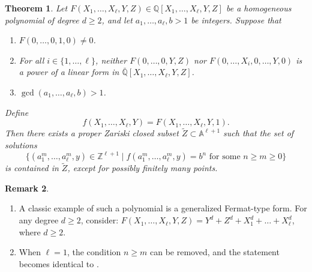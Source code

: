 \documentclass[10pt]{amsart}
\numberwithin{equation}{section}
\theoremstyle{plain}
\newtheorem{theorem}{Theorem}[section]
\theoremstyle{definition}
\newtheorem{remark}[theorem]{Remark}
\begin{document}
\begin{theorem}\label{DiophantinrEq}
Let $F (X_1,\ldots,X_{\ell}, Y, Z) \in \mathbb{Q}[X_1,\ldots,X_{\ell}, Y, Z]$ be a homogeneous polynomial of degree $d \ge 2$, and let $a_1,\ldots,a_{\ell},b > 1$ be integers. Suppose that 
\begin{enumerate}
\item[\rm(i)] $F(0,\ldots,0,1,0) \neq 0$.

\item[\rm(ii)] For all $i \in \{1,\ldots,\ell\}$, neither $F(0,\ldots,0,Y,Z)$ nor $F(0,\ldots,X_i,0,\ldots,Y,0)$ is a power of a linear form in $\bar{\mathbb{Q}}[X_1,\ldots,X_{\ell},Y,Z]$.
\label{tancond}

\item[\rm(iii)] $\gcd(a_1,\ldots,a_{\ell},b) > 1$.
\end{enumerate}

Define 
\[
f(X_1,\ldots,X_{\ell},Y)=F(X_1,\ldots,X_{\ell},Y,1).
\]
Then there exists a proper Zariski closed subset $\tilde Z\subset \mathbb A^{\ell+1}$ such that the set of solutions
\[
\{(a_1^{m},\ldots, a_{\ell}^{m},y) \in \mathbb{Z}^{\ell+1} 
\mid 
f(a_1^{m},\ldots,a_{\ell}^{m},y) = b^n 
\text{ for some } n \ge m \ge 0\}
\]
is contained in $\tilde Z$, except for possibly finitely many points.
\end{theorem}

\begin{remark}
\begin{enumerate}
\item
A classic example of such a polynomial is a generalized Fermat-type form. For any degree $d\ge 2$, consider: $F(X_1,\ldots,X_{\ell},Y,Z)=Y^d+Z^d+X_1^d+\ldots+X_{\ell}^d$, where $d\ge 2$.
\item
When $\ell=1$, the condition $n \geq m$ can be removed, and the statement becomes identical to \cite[Theorem 5.7]{HLX}.
\end{enumerate}
\end{remark}
\end{document}
